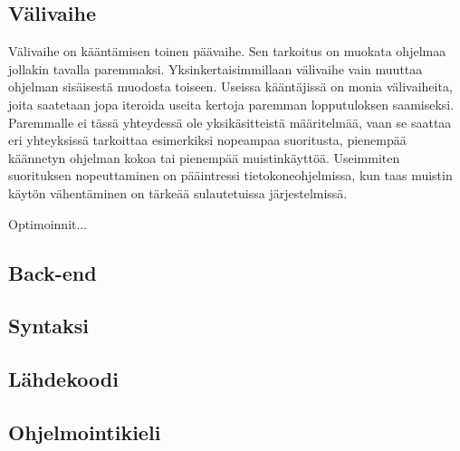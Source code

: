 \subsection{Välivaihe}
Välivaihe on kääntämisen toinen päävaihe.
Sen tarkoitus on muokata ohjelmaa jollakin tavalla paremmaksi.
Yksinkertaisimmillaan välivaihe vain muuttaa ohjelman sisäisestä
muodosta toiseen.
Useissa kääntäjissä on monia välivaiheita, joita saatetaan jopa
iteroida useita kertoja paremman lopputuloksen saamiseksi.
Paremmalle ei tässä yhteydessä ole yksikäsitteistä määritelmää,
vaan se saattaa eri yhteyksissä tarkoittaa esimerkiksi
nopeampaa suoritusta, pienempää käännetyn ohjelman kokoa
tai pienempää muistinkäyttöä. Useimmiten suorituksen nopeuttaminen
on pääintressi tietokoneohjelmissa, kun taas muistin käytön
vähentäminen on tärkeää sulautetuissa järjestelmissä.

Optimoinnit...

\subsection{Back-end}
\subsection{Syntaksi}
\subsection{Lähdekoodi}
\subsection{Ohjelmointikieli}